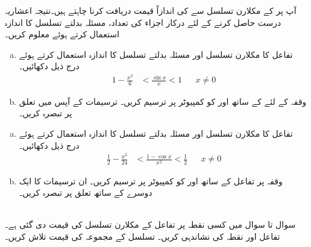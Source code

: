 آپ  پر  کے مکلارن تسلسل سے  کی اندازاً قیمت دریافت کرنا چاہتے ہیں۔نتیجہ  اعشاریہ درست حاصل کرنے کے لئے درکار اجزاء کی تعداد، مسئلہ بدلتے تسلسل کا اندازہ استعمال کرتے ہوئے معلوم کریں۔ 
\begin{enumerate}[a.]
\item
تفاعل  کا مکلارن تسلسل اور مسئلہ بدلتے تسلسل کا اندازہ استعمال کرتے ہوئے درج ذیل دکھائیں۔
\begin{align*}
1-\frac{x^2}{6}&<\frac{\sin x}{x}<1&&x\ne 0
\end{align*}
\item
وقفہ  کے لئے  کے ساتھ  اور  کو کمپیوٹر پر ترسیم کریں۔ ترسیمات کے آپس میں تعلق پر تبصرہ کریں۔
\end{enumerate}
\begin{enumerate}[a.]
\item
تفاعل  کا مکلارن تسلسل اور مسئلہ بدلتے تسلسل کا اندازہ استعمال کرتے ہوئے درج ذیل دکھائیں۔
\begin{align*}
\frac{1}{2}-\frac{x^2}{24}&<\frac{1-\cos x}{x^2}<\frac{1}{2}&&x\ne 0
\end{align*}
\item
وقفہ  پر تفاعل  کے ساتھ  اور  کو کمپیوٹر پر ترسیم کریں۔ ان ترسیمات کا ایک دوسرے کے ساتھ تعلق پر تبصرہ کریں۔
\end{enumerate}
\\
سوال  تا سوال  میں کسی نقطہ پر تفاعل  کے مکلارن تسلسل کی قیمت دی گئی ہے۔ تفاعل اور نقطہ کی نشاندہی کریں۔ تسلسل کے مجموعہ کی قیمت تلاش کریں۔

